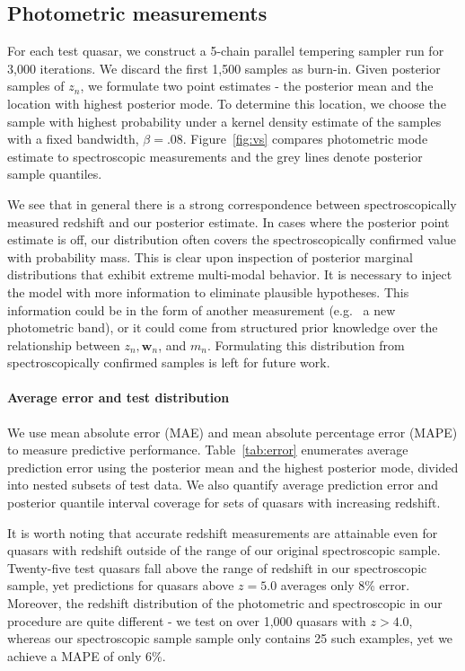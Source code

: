 \documentclass{article}
\begin{document}
\subsection{Photometric measurements}
For each test quasar, we construct a 5-chain parallel tempering sampler run for 3,000 iterations.  We discard the first 1,500 samples as burn-in.  
Given posterior samples of $z_n$, we formulate two point estimates - the posterior mean and the location with highest posterior mode.  
To determine this location, we choose the sample with highest probability under a kernel density estimate of the samples with a fixed bandwidth, $\beta = .08$.  
Figure~\ref{fig:vs} compares photometric mode estimate to spectroscopic measurements and the grey lines denote posterior sample quantiles. 

We see that in general there is a strong correspondence between spectroscopically measured redshift and our posterior estimate.  In cases where the posterior point estimate is off, our distribution often covers the spectroscopically confirmed value with probability mass.
This is clear upon inspection of posterior marginal distributions that exhibit extreme multi-modal behavior.  
It is necessary to inject the model with more information to eliminate plausible hypotheses.  
This information could be in the form of another measurement (e.g.~ a new photometric band), or it could come from structured prior knowledge over the relationship between $z_n, \mathbf{w}_n$, and $m_n$.  Formulating this distribution from spectroscopically confirmed samples is left for future work.  

\paragraph{Average error and test distribution}
We use mean absolute error (MAE) and mean absolute percentage error (MAPE) to measure predictive performance.  
Table~\ref{tab:error} enumerates average prediction error using the posterior mean and the highest posterior mode, divided into nested subsets of test data.  
We also quantify average prediction error and posterior quantile interval coverage for sets of quasars with increasing redshift.  

It is worth noting that accurate redshift measurements are attainable even for quasars with redshift outside of the range of our original spectroscopic sample.  Twenty-five test quasars fall above the range of redshift in our spectroscopic sample, yet predictions for quasars above $z=5.0$ averages only 8\% error.  
Moreover, the redshift distribution of the photometric and spectroscopic in our procedure are quite different - we test on over 1,000 quasars with $z > 4.0$, whereas our spectroscopic sample sample only contains 25 such examples, yet we achieve a MAPE of only 6\%.  
\end{document}
